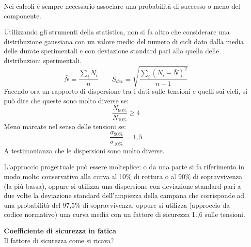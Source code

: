 \documentclass{article}
\begin{document}
\begin{adjustwidth}{2in}{}
			Nei calcoli è sempre necessario associare una probabilità di successo o meno del componente. \newline
			
			Utilizzando gli strumenti della statistica, non si fa altro che considerare una distribuzione gaussiana con un valore medio del numero di cicli dato dalla media delle durate sperimentali e con deviazione standard pari alla quella delle distribuzioni sperimentali. 
			\[\bar{N} = \dfrac{\sum_iN_i}{n} \qquad S_{dev} = \sqrt{\dfrac{\sum_i(N_i-\bar{N})^2}{n-1}}\]
			Facendo ora un rapporto di dispersione tra i dati sulle tensioni e quelli sui cicli, si può dire che queste sono molto diverse se:  
			\[\dfrac{N_{90\%}}{N_{10\%}}\geq4\] 
			Meno marcate nel senso delle tensioni se:
			\[\dfrac{\sigma_{90\%}}{\sigma_{10\%}}=1,5\]
			A testimonianza che le dispersioni sono molto diverse. \newline
			
			L'approccio progettuale può essere molteplice: o da una parte si fa riferimento in modo molto conservativo alla curva al 10\% di rottura o al 90\% di  sopravvivenza (la più bassa), oppure si utilizza una dispersione con deviazione standard pari a due volte la deviazione standard dell'ampiezza della campana che corrisponde ad una probabilità del 97,5\% di sopravvivenza, oppure si utilizza (approccio da codice normativo) una curva media con un fattore di sicurezza 1.,6 sulle tensioni. \newline
			
			\textbf{{\LARGE Coefficiente di sicurezza in fatica}}\\
			Il fattore di sicurezza come si ricava? 
			

\end{adjustwidth}
\end{document}
